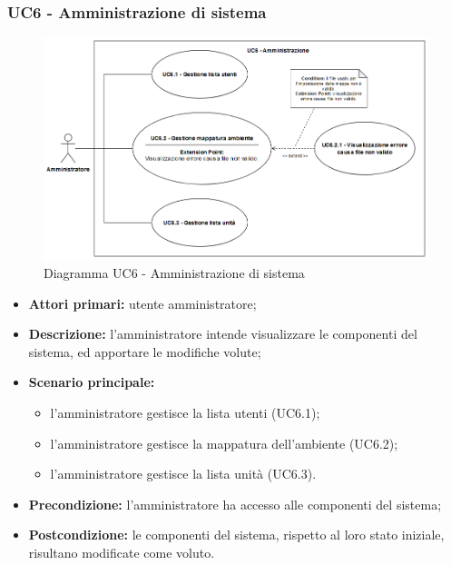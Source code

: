 \subsubsection{UC6 - Amministrazione di sistema}
	\begin{center}
		\begin{figure}[h!]
			\includegraphics[width=17cm]{images/uc6.png}
			\caption{Diagramma UC6 - Amministrazione di sistema}
		\end{figure}
	\end{center}
	\begin{itemize}
		\item \textbf{Attori primari:} utente amministratore;
		\item \textbf{Descrizione:} l'amministratore intende visualizzare le componenti del sistema, ed apportare le modifiche volute;
		\item \textbf{Scenario principale:} 
			\begin{itemize}
				\item l'amministratore gestisce la lista utenti (UC6.1);
				\item l'amministratore gestisce la mappatura dell'ambiente (UC6.2);
				\item l'amministratore gestisce la lista unità (UC6.3).
			\end{itemize}
		\item \textbf{Precondizione:} l'amministratore ha accesso alle componenti del sistema;
		\item \textbf{Postcondizione:} le componenti del sistema, rispetto al loro stato iniziale, risultano modificate come voluto.
	\end{itemize}
	
